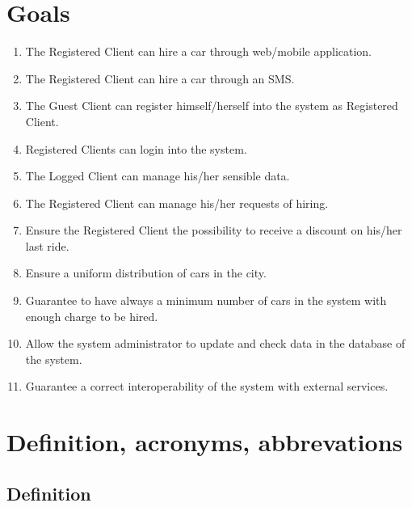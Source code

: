 \section{Goals}
\begin{enumerate}[label=G\arabic*]
\item The Registered Client can hire a car through web/mobile application.
\item The Registered Client can hire a car through an SMS.
\item The Guest Client can register himself/herself into the system as Registered Client.
\item Registered Clients can login into the system.
\item The Logged Client can manage his/her sensible data.
\item The Registered Client can manage his/her requests of hiring.
\item Ensure the Registered Client the possibility to receive a discount on his/her last ride.
\item Ensure a uniform distribution of cars in the city.
\item Guarantee to have always a minimum number of cars in the system with enough charge to be hired.
\item Allow the system administrator to update and check data in the database of the system.
\item Guarantee a correct interoperability of the system with external services.
\end{enumerate}

\section{Definition, acronyms, abbrevations}

\subsection{Definition}

